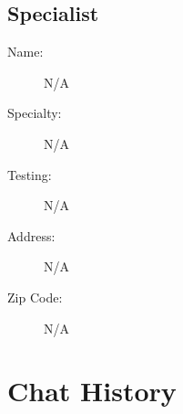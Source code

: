 \documentclass[a4paper,12pt]{article}
\begin{document}
\subsection*{Specialist}
\begin{description}
    \item[Name:] N/A
    \item[Specialty:] N/A
    \item[Testing:] N/A
    \item[Address:] N/A
    \item[Zip Code:] N/A
\end{description}






\section*{Chat History}
\end{document}
